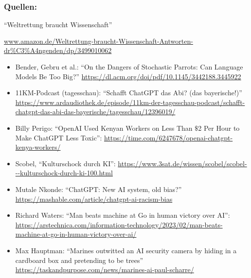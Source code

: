 \documentclass[aspectratio=169,usenames,dvipsnames]{beamer}
\begin{document}
\begin{frame}[fragile]
\frametitle{Quellen:}
\scriptsize
\begin{center}
``Weltrettung braucht Wissenschaft''

\url{www.amazon.de/Weltrettung-braucht-Wissenschaft-Antworten-dr%C3%A4ngenden/dp/3499010062}
\end{center}
\medskip

\begin{itemize}
\item Bender, Gebru et al.: ``On the Dangers of Stochastic Parrots: Can Language Models Be Too Big?'' \url{https://dl.acm.org/doi/pdf/10.1145/3442188.3445922}
\item 11KM-Podcast (tagesschau): ``Schafft ChatGPT das Abi? (das bayerische!)'' \url{https://www.ardaudiothek.de/episode/11km-der-tagesschau-podcast/schafft-chatgpt-das-abi-das-bayerische/tagesschau/12396019/}
\item Billy Perigo: ``OpenAI Used Kenyan Workers on Less Than $\$$2 Per Hour to Make ChatGPT Less Toxic'': \url{https://time.com/6247678/openai-chatgpt-kenya-workers/}
\item Scobel, ``Kulturschock durch KI'': \url{https://www.3sat.de/wissen/scobel/scobel---kulturschock-durch-ki-100.html}
\item Mutale Nkonde: ``ChatGPT: New AI system, old bias?'' \url{https://mashable.com/article/chatgpt-ai-racism-bias}
\item Richard Waters: ``Man beats machine at Go in human victory over AI'': \url{https://arstechnica.com/information-technology/2023/02/man-beats-machine-at-go-in-human-victory-over-ai/}
\item Max Hauptman: ``Marines outwitted an AI security camera by hiding in a cardboard box and pretending to be trees'' \url{https://taskandpurpose.com/news/marines-ai-paul-scharre/}
\end{itemize}
\end{frame}
\end{document}
